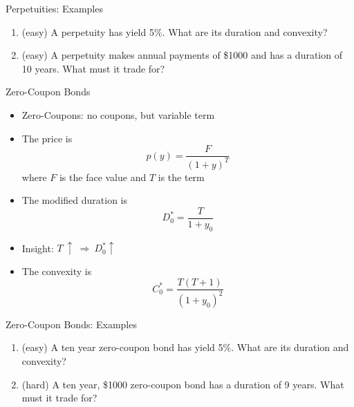 \documentclass{beamer}
\begin{document}
\begin{frame}{Perpetuities: Examples}
    \begin{enumerate}
        \item (easy) A perpetuity has yield 5\%. What are its duration and convexity? 
        \item (easy) A perpetuity makes annual payments of \$1000 and has a duration of 10 years. What must it trade for?
    \end{enumerate}
\end{frame}

\begin{frame}{Zero-Coupon Bonds}
    \begin{itemize}
        \item Zero-Coupons: no coupons, but variable term
        \item The price is
            \begin{equation}
                p(y)=\frac{F}{(1+y)^{T}}
            \end{equation}
            where $F$ is the face value and $T$ is the term
        \item The modified duration is 
            \begin{equation}
                D_{0}^{*}=\frac{T}{1+y_{0}}
            \end{equation}
        \item Insight: $T\:\uparrow\:\Rightarrow\:D_{0}^{*}\uparrow$
        \item The convexity is
            \begin{equation}
                C_{0}^{*}=\frac{T(T+1)}{(1+y_{0})^{2}}
            \end{equation}
    \end{itemize}
\end{frame}

\begin{frame}{Zero-Coupon Bonds: Examples}
    \begin{enumerate}
        \item (easy) A ten year zero-coupon bond has yield 5\%. What are its duration and convexity? 
        \item (hard) A ten year, \$1000 zero-coupon bond has a duration of 9 years. What must it trade for?
    \end{enumerate}
\end{frame}
\end{document}
